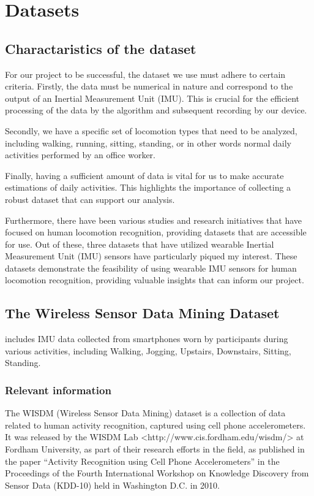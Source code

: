 %
%
%


\chapter{Datasets}
\label{Datasets}
\section{Charactaristics of the dataset}
For our project to be successful, the dataset we use must adhere to certain criteria. Firstly, the data must be numerical in nature and correspond to the output of an Inertial Measurement Unit (IMU). This is crucial for the efficient processing of the data by the algorithm and subsequent recording by our device.

Secondly, we have a specific set of locomotion types that need to be analyzed, including walking, running, sitting, standing, or in other words normal daily activities performed by an office worker.

Finally, having a sufficient amount of data is vital for us to make accurate estimations of daily activities. This highlights the importance of collecting a robust dataset that can support our analysis.

Furthermore, there have been various studies and research initiatives that have focused on human locomotion recognition, providing datasets that are accessible for use. Out of these, three datasets that have utilized wearable Inertial Measurement Unit (IMU) sensors have particularly piqued my interest. These datasets demonstrate the feasibility of using wearable IMU sensors for human locomotion recognition, providing valuable insights that can inform our project.
\section{The Wireless Sensor Data Mining Dataset }
includes IMU data collected from smartphones worn by participants during various activities, including Walking, Jogging, Upstairs, Downstairs, Sitting, Standing. 
\subsection{Relevant information}

The WISDM (Wireless Sensor Data Mining) dataset is a collection of data related to human activity recognition, captured using cell phone accelerometers. It was released by the WISDM Lab  <http://www.cis.fordham.edu/wisdm/> at Fordham University, as part of their research efforts in the field, as published in the paper ``Activity Recognition using Cell Phone Accelerometers'' in the Proceedings of the Fourth International Workshop on Knowledge Discovery from Sensor Data (KDD-10) held in Washington D.C. in 2010. \cite{Kwapisz:2010}

